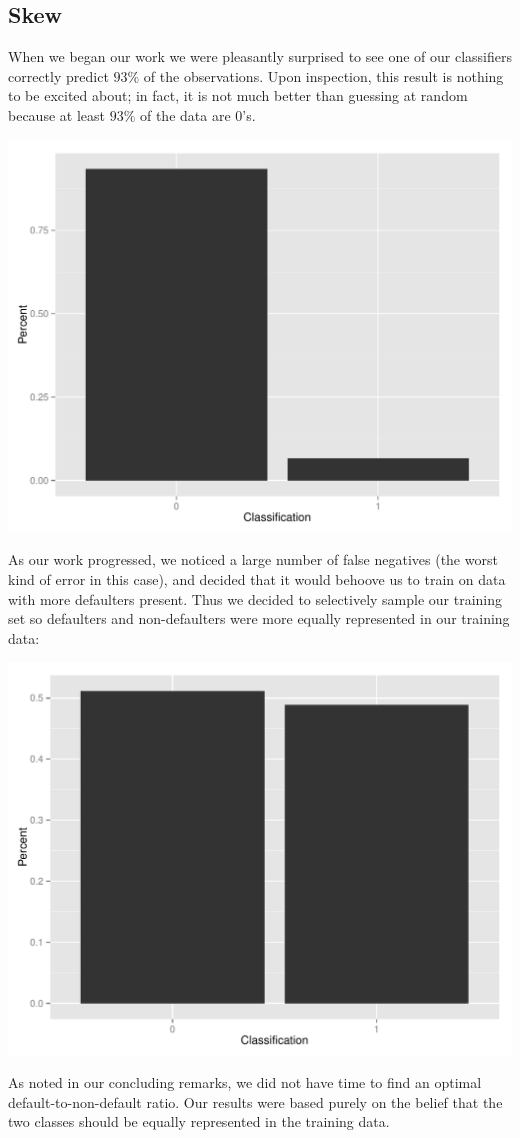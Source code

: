 \documentclass[11pt, oneside]{article}   	%
\begin{document}
	\subsection{Skew}
	When we began our work we were pleasantly surprised to see
	one of our classifiers correctly predict $93\%$ of the observations. Upon inspection,
	this result is nothing to be excited about; in fact, it is not much better than guessing at 
	random because at least $93\%$ of the data are $0$'s.
	\begin{center}
	\includegraphics[scale=0.5]{skew}
	\end{center}  
	As our work progressed, we noticed a large number of false negatives (the worst kind of error in this case), and decided that it would behoove us to train on data with more defaulters present. Thus we decided to selectively
	sample our training set so defaulters and non-defaulters were more equally represented
	in our training data:
	\begin{center}
	\includegraphics[scale=0.5]{less_skew}
	\end{center}
	As noted in our concluding remarks, we did not have time to find an optimal default-to-non-default
	ratio. Our results were based purely on the belief that the two classes should be equally
	represented in the training data.
	
\end{document}
